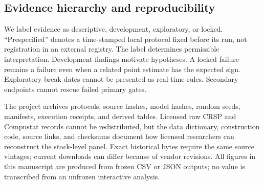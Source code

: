 \subsection{Evidence hierarchy and reproducibility}

We label evidence as descriptive, development, exploratory, or locked. ``Prespecified'' denotes a time-stamped local protocol fixed before its run, not registration in an external registry. The label determines permissible interpretation. Development findings motivate hypotheses. A locked failure remains a failure even when a related point estimate has the expected sign. Exploratory break dates cannot be presented as real-time rules. Secondary endpoints cannot rescue failed primary gates.

The project archives protocols, source hashes, model hashes, random seeds, manifests, execution receipts, and derived tables. Licensed raw CRSP and Compustat records cannot be redistributed, but the data dictionary, construction code, source links, and checksums document how licensed researchers can reconstruct the stock-level panel. Exact historical bytes require the same source vintages; current downloads can differ because of vendor revisions. All figures in this manuscript are produced from frozen CSV or JSON outputs; no value is transcribed from an unfrozen interactive analysis.

